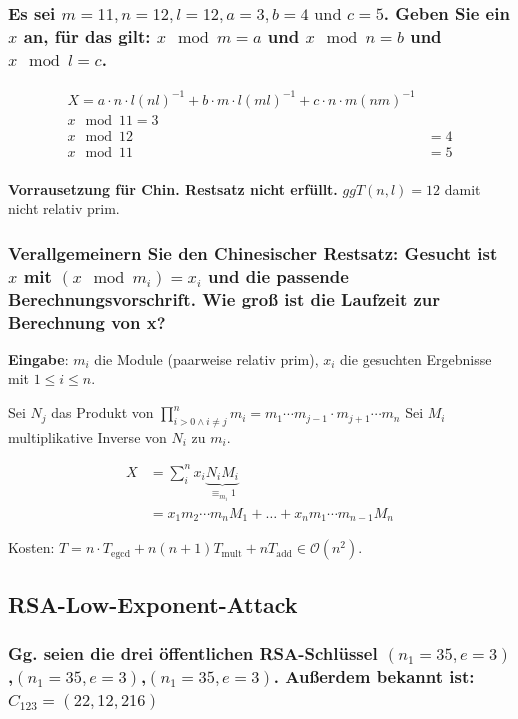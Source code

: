 \subsubsection{Es sei $m = 11, n = 12, l = 12, a = 3, b = 4 \text{ und } c=5$. Geben Sie ein $x$ an, für das
gilt: $x \mod m = a$ und $x \mod n = b$ und $x \mod l = c$.}

\begin{align}
 X = a \cdot n \cdot l (nl)^{-1}
   + b \cdot m \cdot l (ml)^{-1}
   + c \cdot n \cdot m (nm)^{-1} \\
 x \mod 11 = 3 \\
  x \mod 12 &= 4\\
   x \mod 11 &= 5\\
\end{align}




\textbf{Vorrausetzung für Chin. Restsatz nicht erfüllt.}
$ggT(n,l)=12$ damit nicht relativ prim.


\subsubsection{Verallgemeinern Sie den Chinesischer Restsatz:
Gesucht ist $x$ mit $(x \mod m_i)=x_i$ und die passende Berechnungsvorschrift. Wie groß ist die Laufzeit zur Berechnung von x?}

\textbf{Eingabe}: $m_i$ die Module (paarweise relativ prim), $x_i$ die gesuchten Ergebnisse mit $1 \le i \le n$. 

Sei $N_j$ das Produkt von $ \prod_{i>0 \wedge i \ne j}^{n} m_i = 
	m_1 \cdots m_{j-1} \cdot m_{j+1} \cdots m_n$	
Sei $M_i$ multiplikative Inverse von $N_i$ zu $m_i$.

\begin{align}
	X &= \sum_{i}^{n} x_i \underbrace{N_i M_i}_{\equiv_{m_i} 1} \\
	  &= x_1 m_2 \cdots m_n M_1 + \ldots + x_n m_1 \cdots m_{n-1} M_n	
\end{align}

Kosten: $T = n \cdot T_{\text{egcd}} + n (n+1) T_{\text{mult}} + n T_{\text{add}} \in \mathcal{O}(n^2)$.

\subsection{RSA-Low-Exponent-Attack}
\subsubsection{Gg. seien die drei öffentlichen RSA-Schlüssel $(n_1 = 35,e=3)$,$(n_1 = 35,e=3)$,$(n_1 = 35,e=3)$.
Außerdem bekannt ist: $C_{123}=(22,12,216)$}


